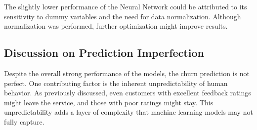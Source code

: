 \documentclass[12pt]{article}
\begin{document}
The slightly lower performance of the Neural Network could be attributed to its sensitivity to dummy variables and the need for data normalization. Although normalization was performed, further optimization might improve results.

\subsection{Discussion on Prediction Imperfection}
Despite the overall strong performance of the models, the churn prediction is not perfect. One contributing factor is the inherent unpredictability of human behavior. As previously discussed, even customers with excellent feedback ratings might leave the service, and those with poor ratings might stay. This unpredictability adds a layer of complexity that machine learning models may not fully capture.
\end{document}
